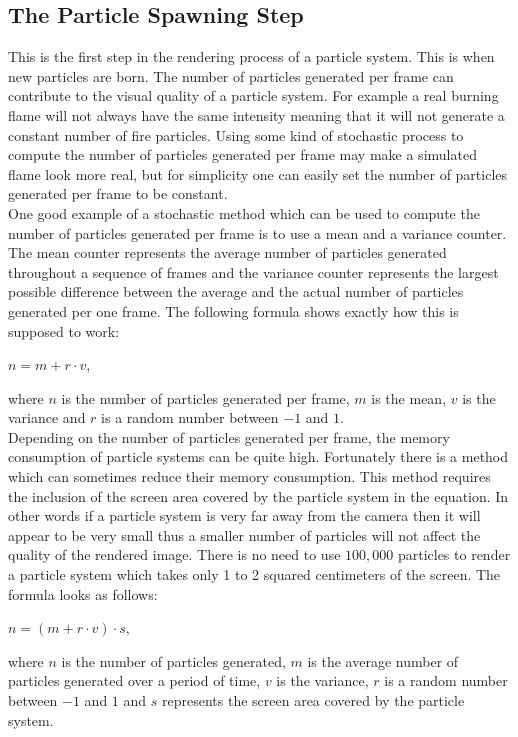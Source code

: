 \newpage
\subsection{The Particle Spawning Step}
This is the first step in the rendering process of a particle system. This is when new particles are born. The number of particles generated per frame can contribute to the visual quality of a particle system. For example a real burning flame will not always have the same intensity meaning that it will not generate a constant number of fire particles. Using some kind of stochastic process to compute the number of particles generated per frame may make a simulated flame look more real, but for simplicity one can easily set the number of particles generated per frame to be constant.\\

One good example of a stochastic method which can be used to compute the number of particles generated per frame is to use a mean and a variance counter. The mean counter represents the average number of particles generated throughout a sequence of frames and the variance counter represents the largest possible difference between the average and the actual number of particles generated per one frame. The following formula shows exactly how this is supposed to work:
\begin{center}
	$n = m + r \cdot v$,
\end{center}
where $n$ is the number of particles generated per frame, $m$ is the mean, $v$ is the variance and $r$ is a random number between $-1$ and $1$.\\

Depending on the number of particles generated per frame, the memory consumption of particle systems can be quite high. Fortunately there is a method which can sometimes reduce their memory consumption. This method requires the inclusion of the screen area covered by the particle system in the equation. In other words if a particle system is very far away from the camera then it will appear to be very small thus a smaller number of particles will not affect the quality of the rendered image. There is no need to use $100,000$ particles to render a particle system which takes only 1 to 2 squared centimeters of the screen. The formula looks as follows:
\begin{center}
	$n = (m + r \cdot v) \cdot s$,
\end{center}
where $n$ is the number of particles generated, $m$ is the average number of particles generated over a period of time, $v$ is the variance, $r$ is a random number between $-1$ and $1$ and $s$ represents the screen area covered by the particle system.\\

